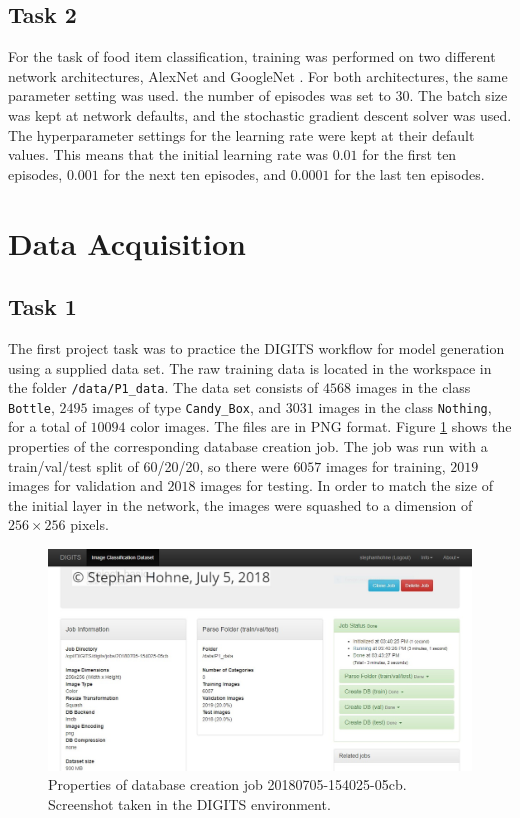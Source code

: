 \documentclass[10pt, journal, compsoc]{IEEEtran}
\newcommand{\an}{AlexNet }
\newcommand{\gn}{GoogleNet }
\begin{document}
\subsection{Task 2}
For the task of food item classification, training was performed on two different network architectures, \an \cite{NIPS2012_4824} and \gn \cite{DBLP:journals/corr/SzegedyLJSRAEVR14}. For both architectures, the same parameter setting was used. the number of episodes was set to $30$. The batch size was kept at network defaults, and the stochastic gradient descent solver was used.  The hyperparameter settings for the learning rate were kept at their default values. This means that the initial learning rate was $0.01$ for the first ten episodes, $0.001$ for the next ten episodes, and $0.0001$ for the last ten episodes.

\section{Data Acquisition}
\label{sec:data_acquisition}
\subsection{Task 1}
The first project task was to practice the DIGITS workflow for model generation using a supplied data set. The raw training data is located in the workspace in the folder \texttt{/data/P1\_data}. The data set consists of $4568$ images in the class \texttt{Bottle}, $2495$ images of type \texttt{Candy\_Box}, and $3031$ images in the class \texttt{Nothing}, for a total of $10094$ color images. The files are in PNG format. Figure \ref{fig:default_dataset} shows the properties of the corresponding database creation job. The job was run with a train/val/test split of 60/20/20, so there were  $6057$ images for training, $2019$ images for validation and $2018$ images for testing. In order to match the size of the initial layer in the network, the images were squashed to a dimension of $256 \times 256$ pixels.

\begin{figure}[htpb]
      \centering
      \includegraphics[width=\columnwidth]{images/default_dataset/dataset.PNG}
      \caption{Properties of database creation job 20180705-154025-05cb. Screenshot taken in the DIGITS environment.}
      \label{fig:default_dataset}
\end{figure}
\end{document}
